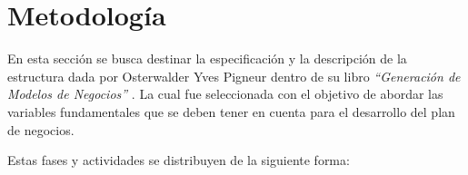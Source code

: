 \cleardoublepage 
{}
\section*{Metodología}
En esta sección se busca destinar la especificación y la descripción de la estructura dada por Osterwalder Yves Pigneur dentro de su libro \textit{``Generación de Modelos de Negocios''} \parencite{BusinessModel01}. La cual fue seleccionada con el objetivo de abordar las variables fundamentales que se deben tener en cuenta para el desarrollo del plan de negocios.

Estas fases y actividades se distribuyen de la siguiente forma:










%